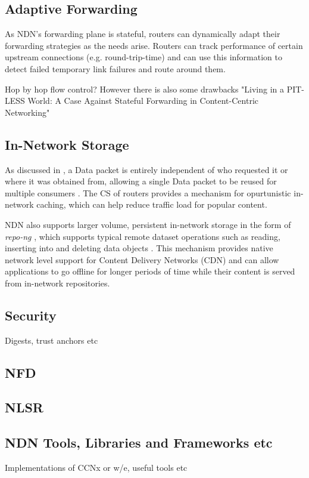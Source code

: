 \subsection*{Adaptive Forwarding}
As NDN's forwarding plane is stateful, routers can dynamically adapt their forwarding strategies as the needs arise. Routers can track performance of certain upstream connections (e.g. round-trip-time) and can use this information to detect failed temporary link failures and route around them.

Hop by hop flow control?
However there is also some drawbacks "Living in a PIT-LESS World: A Case Against
Stateful Forwarding in Content-Centric Networking"

\subsection{In-Network Storage}
As discussed in , a Data packet is entirely independent of who requested it or where it was obtained from, allowing a single Data packet to be reused for multiple consumers \cite{ndn}. The CS of routers provides a mechanism for opurtunistic in-network caching, which can help reduce traffic load for popular content. 

NDN also supports larger volume, persistent in-network storage in the form of \textit{repo-ng} \cite{ndn-repo}, which supports typical remote dataset operations such as reading, inserting into and deleting data objects \cite{ndn-repo-homepage}. This mechanism provides native network level support for Content Delivery Networks (CDN) \cite{ndn} and can allow applications to go offline for longer periods of time while their content is served from in-network repositories.

\subsection{Security}
Digests, trust anchors etc


\subsection{NFD}


\subsection{NLSR}\label{sec:NLSR}


\subsection{NDN Tools, Libraries and Frameworks etc}
Implementations of CCNx or w/e, useful tools etc

